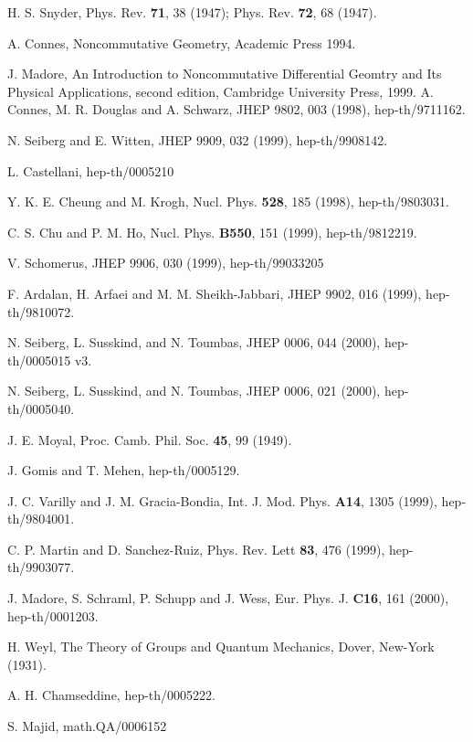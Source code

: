 \documentclass[a4paper,10pt]{article}
\begin{document}
\begin{thebibliography}{100}
 H. S. Snyder, Phys. Rev. {\bf 71}, 38 (1947); Phys. Rev.
{\bf 72}, 68 (1947).

 A. Connes, Noncommutative Geometry, Academic Press 1994.

 J. Madore, An Introduction to Noncommutative Differential
Geomtry and Its Physical Applications, second edition, Cambridge University
Press, 1999.
 A. Connes, M. R. Douglas and A. Schwarz, JHEP 9802,
003 (1998), hep-th/9711162.

 N. Seiberg and E. Witten, JHEP 9909, 032 (1999),
hep-th/9908142.

 L. Castellani, hep-th/0005210

 Y. K. E. Cheung and M. Krogh, Nucl. Phys. {\bf 528}, 185
(1998), hep-th/9803031.

 C. S. Chu and P. M. Ho, Nucl. Phys. {\bf B550}, 151 (1999),
hep-th/9812219.

 V. Schomerus, JHEP 9906, 030 (1999),
hep-th/99033205

 F. Ardalan, H. Arfaei and M. M. Sheikh-Jabbari, JHEP
9902, 016 (1999), hep-th/9810072.

 N. Seiberg, L. Susskind, and N. Toumbas, JHEP 0006,
044 (2000), hep-th/0005015 v3.

 N. Seiberg, L. Susskind, and N. Toumbas,
JHEP 0006, 021 (2000), hep-th/0005040.

 J. E. Moyal, Proc. Camb. Phil. Soc. {\bf 45}, 99
(1949).

 J. Gomis and T. Mehen, hep-th/0005129.

 J. C. Varilly and J. M. Gracia-Bondia, Int. J. Mod.
Phys. {\bf A14}, 1305 (1999), hep-th/9804001.

 C. P. Martin and D. Sanchez-Ruiz, Phys. Rev. Lett {\bf
83}, 476 (1999), hep-th/9903077.

 J. Madore, S. Schraml, P. Schupp and J. Wess,
Eur. Phys. J. {\bf C16}, 161 (2000), hep-th/0001203.
 
 H. Weyl, The Theory of Groups and Quantum Mechanics, Dover,
New-York (1931).

 A. H. Chamseddine, hep-th/0005222.

 S. Majid, math.QA/0006152


\end{thebibliography}
\end{document}
